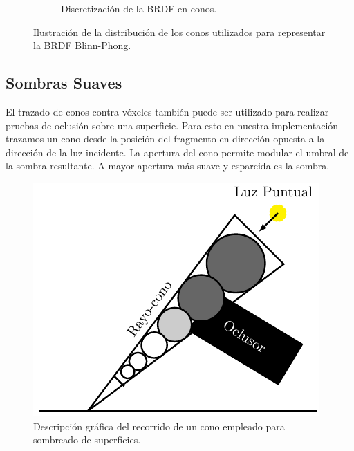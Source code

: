 \begin{figure}[H]
\begin{subfigure}[t]{.32\linewidth}
		\caption*{Discretización de la BRDF en conos.}
	\end{subfigure}%
	\caption{Ilustración de la distribución de los conos utilizados para representar la \ac{BRDF} Blinn-Phong.}
	\label{fig:brdf_cones2}
\end{figure}

\subsection{Sombras Suaves} %
\label{sub:sombras_suaves_con_trazado_de_conos}
El trazado de conos contra vóxeles también puede ser utilizado para realizar pruebas de oclusión sobre una superficie. Para esto en nuestra implementación trazamos un cono desde la posición del fragmento en dirección opuesta a la dirección de la luz incidente. La apertura del cono permite modular el umbral de la sombra resultante. A mayor apertura más suave y esparcida es la sombra.

\begin{figure}[H]
	\centering
	\captionsetup{justification=centering}
	\includegraphics[width=.4\linewidth]{media/shadow_cone.pdf}
	\caption{Descripción gráfica del recorrido de un cono empleado para sombreado de superficies.}
\end{figure}

